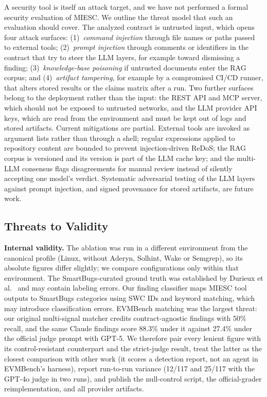 \documentclass[conference]{IEEEtran}
\begin{document}
A security tool is itself an attack target, and we have not performed a formal security evaluation of MIESC. We outline the threat model that such an evaluation should cover. The analyzed contract is untrusted input, which opens four attack surfaces: (1)~\emph{command injection} through file names or paths passed to external tools; (2)~\emph{prompt injection} through comments or identifiers in the contract that try to steer the LLM layers, for example toward dismissing a finding; (3)~\emph{knowledge-base poisoning} if untrusted documents enter the RAG corpus; and (4)~\emph{artifact tampering}, for example by a compromised CI/CD runner, that alters stored results or the claims matrix after a run. Two further surfaces belong to the deployment rather than the input: the REST API and MCP server, which should not be exposed to untrusted networks, and the LLM provider API keys, which are read from the environment and must be kept out of logs and stored artifacts. Current mitigations are partial. External tools are invoked as argument lists rather than through a shell; regular expressions applied to repository content are bounded to prevent injection-driven ReDoS; the RAG corpus is versioned and its version is part of the LLM cache key; and the multi-LLM consensus flags disagreements for manual review instead of silently accepting one model's verdict. Systematic adversarial testing of the LLM layers against prompt injection, and signed provenance for stored artifacts, are future work.

\subsection{Threats to Validity}

\textbf{Internal validity.} The ablation was run in a different environment from the canonical profile (Linux, without Aderyn, Solhint, Wake or Semgrep), so its absolute figures differ slightly; we compare configurations only within that environment. The SmartBugs-curated ground truth was established by Durieux et al.~\cite{durieux2020empirical} and may contain labeling errors. Our finding classifier maps MIESC tool outputs to SmartBugs categories using SWC IDs and keyword matching, which may introduce classification errors. EVMBench matching was the largest threat: our original multi-signal matcher credits contract-agnostic findings with 50\% recall, and the same Claude findings score 88.3\% under it against 27.4\% under the official judge prompt with GPT-5. We therefore pair every lenient figure with its control-resistant counterpart and the strict-judge result, treat the latter as the closest comparison with other work (it scores a detection report, not an agent in EVMBench's harness), report run-to-run variance (12/117 and 25/117 with the GPT-4o judge in two runs), and publish the null-control script, the official-grader reimplementation, and all provider artifacts.
\end{document}
